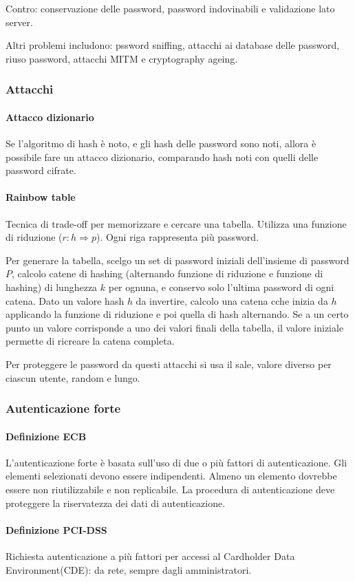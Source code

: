 \documentclass[11pt]{article}
\begin{document}
Contro: conservazione delle password, password indovinabili e validazione lato server.

Altri problemi includono: pssword sniffing, attacchi ai database delle password, riuso password, attacchi MITM e cryptography
ageing.
\subsubsection{Attacchi}
\paragraph*{Attacco dizionario}
Se l'algoritmo di hash è noto, e gli hash delle password sono noti, allora è possibile fare un attacco dizionario, comparando
hash noti con quelli delle password cifrate.
\paragraph*{Rainbow table}
Tecnica di trade-off per memorizzare e cercare una tabella. Utilizza una funzione di riduzione ($r:h\Rightarrow p$).
Ogni riga rappresenta più password.

Per generare la tabella, scelgo un set di password iniziali dell'insieme di password $P$, calcolo catene di hashing (alternando 
funzione di riduzione e funzione di hashing) di lunghezza $k$ per ognuna, e conservo solo l'ultima password di ogni catena.
Dato un valore hash $h$ da invertire, calcolo una catena cche inizia da $h$ applicando la funzione di riduzione e poi quella 
di hash alternando. Se a un certo punto un valore corrisponde a uno dei valori finali della tabella, il valore iniziale 
permette di ricreare la catena completa.

Per proteggere le password da questi attacchi si usa il sale, valore diverso per ciascun utente, random e lungo. 
\subsubsection{Autenticazione forte}
\paragraph*{Definizione ECB}
L'autenticazione forte è basata sull'uso di due o più fattori di autenticazione. Gli elementi selezionati devono essere 
indipendenti. Almeno un elemento dovrebbe essere non riutilizzabile e non replicabile. La procedura di autenticazione deve
proteggere la riservatezza dei dati di autenticazione.
\paragraph*{Definizione PCI-DSS}
Richiesta autenticazione a più fattori per accessi al Cardholder Data Environment(CDE): da rete, sempre dagli amministratori.
\end{document}
